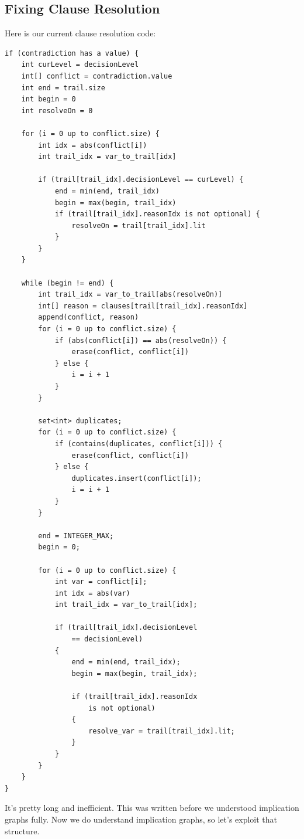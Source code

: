 \documentclass[oneside]{book}
\begin{document}
\subsection{Fixing Clause Resolution}

Here is our current clause resolution code:
\begin{lstlisting}
if (contradiction has a value) {
    int curLevel = decisionLevel
    int[] conflict = contradiction.value
    int end = trail.size
    int begin = 0
    int resolveOn = 0

    for (i = 0 up to conflict.size) {
        int idx = abs(conflict[i])
        int trail_idx = var_to_trail[idx]

        if (trail[trail_idx].decisionLevel == curLevel) {
            end = min(end, trail_idx)
            begin = max(begin, trail_idx)
            if (trail[trail_idx].reasonIdx is not optional) {
                resolveOn = trail[trail_idx].lit
            }
        }
    }

    while (begin != end) {
        int trail_idx = var_to_trail[abs(resolveOn)]
        int[] reason = clauses[trail[trail_idx].reasonIdx]
        append(conflict, reason)
        for (i = 0 up to conflict.size) {
            if (abs(conflict[i]) == abs(resolveOn)) {
                erase(conflict, conflict[i])
            } else {
                i = i + 1
            }
        }

        set<int> duplicates;
        for (i = 0 up to conflict.size) {
            if (contains(duplicates, conflict[i])) {
                erase(conflict, conflict[i])
            } else {
                duplicates.insert(conflict[i]);
                i = i + 1
            }
        }

        end = INTEGER_MAX;
        begin = 0;

        for (i = 0 up to conflict.size) {
            int var = conflict[i];
            int idx = abs(var)
            int trail_idx = var_to_trail[idx];

            if (trail[trail_idx].decisionLevel 
                == decisionLevel)
            {
                end = min(end, trail_idx);
                begin = max(begin, trail_idx);

                if (trail[trail_idx].reasonIdx 
                    is not optional)
                {
                    resolve_var = trail[trail_idx].lit;
                }
            }
        }
    } 
}
\end{lstlisting}
\noindent
It's pretty long and inefficient. This was written before we understood implication
graphs fully. Now we do understand implication graphs, so let's exploit that structure.
\end{document}
